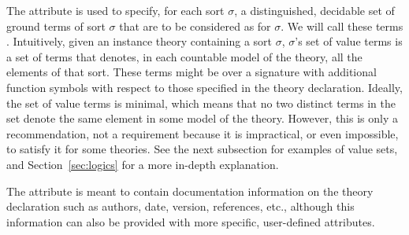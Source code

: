 The attribute  is used to specify, for each sort $\sigma$, 
a distinguished, decidable set of ground terms of sort $\sigma$ 
that are to be considered as  for $\sigma$.
We will call these terms .
Intuitively, given an instance theory containing a sort $\sigma$,
$\sigma$'s set of value terms is a set of terms that denotes, 
in each countable model of the theory, all the elements of that sort.
These terms might be over a signature with additional function symbols 
with respect to those specified in the theory declaration.
Ideally, the set of value terms is minimal, which means that 
no two distinct terms in the set denote the same element in some model 
of the theory.
However, this is only a recommendation, not a requirement 
because it is impractical, or even impossible, to satisfy it 
for some theories.
%
See the next subsection for examples of value sets, and
Section~\ref{sec:logics} for a more in-depth explanation.


The attribute  is meant 
to contain documentation information on the theory declaration 
such as authors, date, version, references, etc.,
although this information can also be provided 
with more specific, user-defined attributes.

